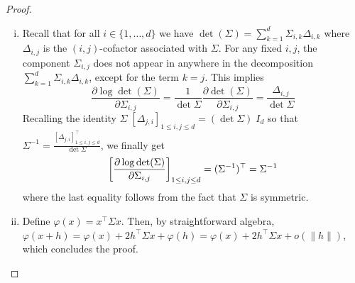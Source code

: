 \documentclass[english,graybox,envcountchap,envcountsame,sectrefs,shortlabels]{svmono}
\theoremstyle{style}
\begin{document}
\begin{proof}
  \begin{enumerate}[(i)]
    \item Recall that for all $i \in \{1,\ldots,d\}$ we have
      $\det(\Sigma)=\sum_{k=1}^d \Sigma_{i,k} \Delta_{i,k}$ where
      $\Delta_{i,j}$ is the $(i,j)$-cofactor associated with
      $\Sigma$. For any fixed $i,j$, the component $\Sigma_{i,j}$ does not appear in anywhere in
      the decomposition $\sum_{k=1}^d \Sigma_{i,k} \Delta_{i,k}$,
      except for the term $k=j$. This implies
      $$
      \frac{\partial \log \det(\Sigma)}{\partial \Sigma_{i,j}}=
      \frac{1}{\det \Sigma}\frac{\partial  \det(\Sigma)}{\partial
        \Sigma_{i,j}}=\frac{\Delta_{i,j}}{\det  \Sigma}
      $$
      Recalling the identity $\Sigma\; [\Delta_{j,i}]_{1\leq i,j \leq d}=(\det
      \Sigma)\; I_d$ so that $\Sigma^{-1}=\frac{[\Delta_{j,i}]_{1\leq i,j \leq d}^\top}{\det
      \Sigma}$, we finally get
      $$
\left[\frac{\partial \log \det(\Sigma)}{\partial \Sigma_{i,j}}\right]_{1\leq
  i,j  \leq d}=(\Sigma^{-1})^\top=\Sigma^{-1}
$$
where the last equality follows from the fact that $\Sigma$ is
symmetric.
\item Define $\varphi(x)=x^\top\Sigma x$. Then, by straightforward
  algebra, $\varphi(x+h)=\varphi(x)+2h^\top\Sigma
  x+\varphi(h)=\varphi(x)+2h^\top\Sigma x+o(\|h\|)$, which concludes the
  proof.
  \end{enumerate}
\end{proof}
\end{document}
